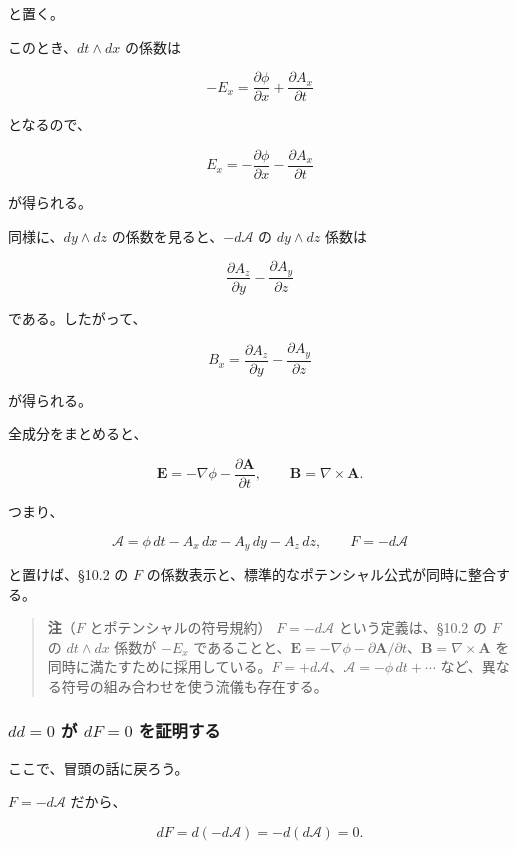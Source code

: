 \documentclass[a4paper,12pt,openany]{book}
\begin{document}
と置く。

このとき、\(dt\wedge dx\) の係数は

\[
-E_x
=
\frac{\partial\phi}{\partial x}
+
\frac{\partial A_x}{\partial t}
\]

となるので、

\[
E_x
=
-\frac{\partial\phi}{\partial x}
-
\frac{\partial A_x}{\partial t}
\]

が得られる。

同様に、\(dy\wedge dz\) の係数を見ると、\(-d\mathcal{A}\) の
\(dy\wedge dz\) 係数は

\[
\frac{\partial A_z}{\partial y}
-
\frac{\partial A_y}{\partial z}
\]

である。したがって、

\[
B_x
=
\frac{\partial A_z}{\partial y}
-
\frac{\partial A_y}{\partial z}
\]

が得られる。

全成分をまとめると、

\[
\mathbf{E}
=
-\nabla\phi
-
\frac{\partial\mathbf{A}}{\partial t},
\qquad
\mathbf{B}
=
\nabla\times\mathbf{A}.
\]

つまり、

\[
\mathcal{A}
=
\phi\,dt
-
A_x\,dx
-
A_y\,dy
-
A_z\,dz,
\qquad
F=-d\mathcal{A}
\]

と置けば、§10.2 の \(F\)
の係数表示と、標準的なポテンシャル公式が同時に整合する。

\begin{quote}
\textbf{注}（\(F\) とポテンシャルの符号規約） \(F=-d\mathcal{A}\)
という定義は、§10.2 の \(F\) の \(dt\wedge dx\) 係数が \(-E_x\)
であることと、\(\mathbf{E}=-\nabla\phi-\partial\mathbf{A}/\partial t\)、\(\mathbf{B}=\nabla\times\mathbf{A}\)
を同時に満たすために採用している。\(F=+d\mathcal{A}\)、\(\mathcal{A}=-\phi\,dt+\cdots\)
など、異なる符号の組み合わせを使う流儀も存在する。
\end{quote}

\hypertarget{dd0-ux304c-df0-ux3092ux8a3cux660eux3059ux308b}{%
\subsubsection{\texorpdfstring{\(dd=0\) が \(dF=0\)
を証明する}{dd=0 が dF=0 を証明する}}\label{dd0-ux304c-df0-ux3092ux8a3cux660eux3059ux308b}}

ここで、冒頭の話に戻ろう。

\(F=-d\mathcal{A}\) だから、

\[
dF
=
d(-d\mathcal{A})
=
-d(d\mathcal{A})
=
0.
\]
\end{document}
